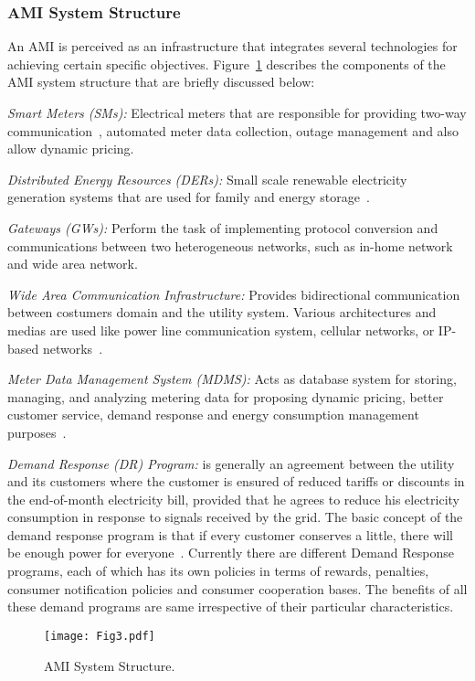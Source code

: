 \subsubsection{AMI System Structure}
An AMI is perceived as an infrastructure that integrates several technologies for achieving certain specific objectives. Figure~\ref{fig:sample} describes the components of the AMI system structure that are briefly discussed below: 

\textit{Smart Meters (SMs):} Electrical meters that are responsible for providing two-way communication~\cite{Saputro11}, automated meter data collection, outage management and also allow dynamic pricing.

\textit{Distributed Energy Resources (DERs):} Small scale renewable electricity generation systems that are used for family and energy storage~\cite{Colak16}.

\textit{Gateways (GWs):} Perform the task of implementing protocol conversion and communications between two heterogeneous networks, such as in-home network and wide area network.

\textit{Wide Area Communication Infrastructure:} Provides bidirectional communication between costumers domain and the utility system. Various architectures and medias are used like power line communication system, cellular networks, or IP-based networks~\cite{Sauter11}.

\textit{Meter Data Management System (MDMS):} Acts as database system for storing, managing, and analyzing metering data for proposing dynamic pricing, better customer service, demand response and energy consumption management purposes~\cite{Wan14}.

\textit{Demand Response (DR) Program:} is generally an agreement between the utility and its customers where the customer is ensured of reduced tariffs or discounts in the end-of-month electricity bill, provided that he agrees to reduce his electricity consumption in response to signals received by the grid. The basic concept of the demand response program is that if every customer conserves a little, there will be enough power for everyone~\cite{Kabalci16}. Currently there are different Demand Response programs, each of which has its own policies in terms of rewards, penalties, consumer notification policies and consumer cooperation bases. The benefits of all these demand programs are same irrespective of their particular characteristics.

\begin{figure}[h]
 \centering %
 \texttt{[image: Fig3.pdf]}
 \caption{AMI System Structure.}
 \label{fig:sample}
\end{figure}


